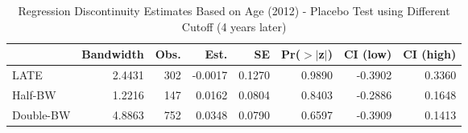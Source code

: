 \begin{table}[ht]
\centering
\begin{tabular}{lrrrrrrr}
  \hline
 & Bandwidth & Obs. & Est. & SE & Pr($>$$|$z$|$) & CI (low) & CI (high) \\ 
  \hline
LATE & 2.4431 & 302 & -0.0017 & 0.1270 & 0.9890 & -0.3902 & 0.3360 \\ 
  Half-BW & 1.2216 & 147 & 0.0162 & 0.0804 & 0.8403 & -0.2886 & 0.1648 \\ 
  Double-BW & 4.8863 & 752 & 0.0348 & 0.0790 & 0.6597 & -0.3909 & 0.1413 \\ 
   \hline
\end{tabular}
\caption{Regression Discontinuity Estimates Based on Age (2012) - Placebo Test using Different Cutoff (4 years later)} 
\label{tab:rd2012y_plac}
\end{table}
